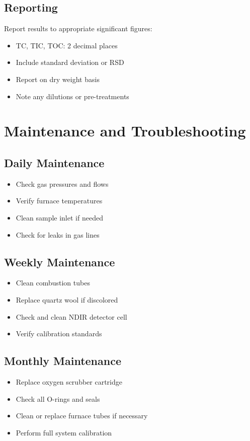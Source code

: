 \documentclass[11pt,a4paper]{article}\usepackage[]{graphicx}\usepackage[]{xcolor}
\begin{document}
\subsection{Reporting}
Report results to appropriate significant figures:
\begin{itemize}[noitemsep]
    \item TC, TIC, TOC: 2 decimal places
    \item Include standard deviation or RSD
    \item Report on dry weight basis
    \item Note any dilutions or pre-treatments
\end{itemize}

\section{Maintenance and Troubleshooting}

\subsection{Daily Maintenance}
\begin{itemize}[noitemsep]
    \item Check gas pressures and flows
    \item Verify furnace temperatures
    \item Clean sample inlet if needed
    \item Check for leaks in gas lines
\end{itemize}

\subsection{Weekly Maintenance}
\begin{itemize}[noitemsep]
    \item Clean combustion tubes
    \item Replace quartz wool if discolored
    \item Check and clean NDIR detector cell
    \item Verify calibration standards
\end{itemize}

\subsection{Monthly Maintenance}
\begin{itemize}[noitemsep]
    \item Replace oxygen scrubber cartridge
    \item Check all O-rings and seals
    \item Clean or replace furnace tubes if necessary
    \item Perform full system calibration
\end{itemize}
\end{document}

